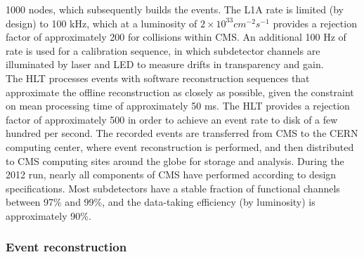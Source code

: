 1000 nodes, which subsequently builds the events. The L1A rate is limited (by design) to 100 kHz, 
which at a luminosity of $2 \times 10^{33} cm^{-2} s^{-1}$ provides a rejection factor of approximately 200 for
collisions within CMS. An additional 100 Hz of rate is used for a calibration sequence,
in which subdetector channels are illuminated by laser and LED to measure drifts in
transparency and gain. \\
\indent The HLT processes events with software reconstruction sequences that approximate 
the offline reconstruction as closely as possible, given the constraint on mean
processing time of approximately 50 ms. The HLT provides a rejection factor of
approximately 500 in order to achieve an event rate to disk of a few hundred per 
second. The recorded events are transferred from CMS to the CERN computing center,
where event reconstruction is performed, and then distributed to CMS computing
sites around the globe for storage and analysis. During the 2012 run, nearly all 
components of CMS have performed according to design specifications. Most subdetectors 
have a stable fraction of functional channels between 97\% and 99\%, and the data-taking 
efficiency (by luminosity) is approximately 90\%.

\subsubsection{Event reconstruction}

